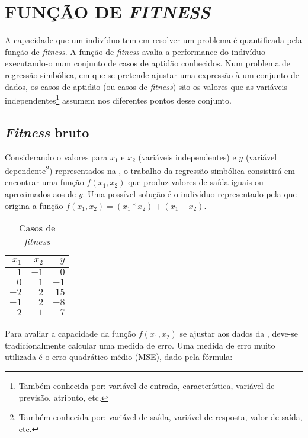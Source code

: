 \section{FUNÇÃO DE \emph{FITNESS}}
\label{sec:2funcaofitness}

A capacidade que um indivíduo tem em resolver um problema é quantificada pela função de \emph{fitness}. 
A função de \emph{fitness} avalia a performance do indivíduo executando-o num conjunto de casos de aptidão conhecidos. 
Num problema de regressão simbólica, em que se pretende ajustar uma expressão à um conjunto de dados, os casos de aptidão 
(ou casos de \emph{fitness}) são os valores que as variáveis independentes\footnote{Também conhecida
por: variável de entrada, característica, variável de previsão, atributo, etc.} assumem nos diferentes pontos desse conjunto.

\subsection{\emph{Fitness} bruto}
\label{subsec:2fitnessbruto}

Considerando o valores para $x_1$ e $x_2$ (variáveis independentes) e $y$ (variável dependente\footnote{Também conhecida
por: variável de saída, variável de resposta, valor de saída, etc.}) representados na , o trabalho 
da regressão simbólica consistirá em encontrar uma função $f(x_1,x_2)$ que produz valores de saída iguais ou aproximados aos de $y$. 
Uma possível solução é o indivíduo representado pela  que origina a função $f(x_1,x_2)= (x_1*x_2 )+(x_1-x_2)$.

\begin{table}[H]
    \begin{tabular}{rrr}%
    \toprule
   	$x_1$ 	&	$x_2$	&	$y$\\ 
   	\midrule
    $1$		&	$-1$	&	$0$\\ 
    $0$		&	$1$		&	$-1$\\ 
   	$-2$	&	$2$		&	$15$\\ 
    $-1$	&	$2$		&	$-8$\\ 
    $2$		&	$-1$	&	$7$\\
    \bottomrule %
    \end{tabular} %
    \centering
    \caption{Casos de \emph{fitness}}
    \label{Tabela241}
\end{table}

Para avaliar a capacidade da função $f(x_1,x_2)$ se ajustar aos dados da , deve-se tradicionalmente calcular uma 
medida de erro. Uma medida de erro muito utilizada é o erro quadrático médio (\ac{MSE}), dado pela fórmula:

